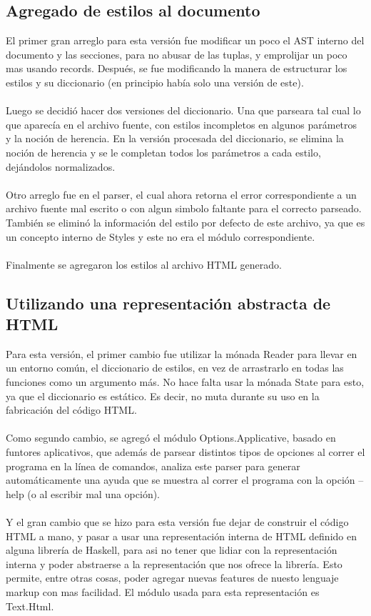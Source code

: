\documentclass{article}
\begin{document}
\subsection{Agregado de estilos al documento}
El primer gran arreglo para esta versión fue modificar un poco el AST interno del documento y las secciones, para no abusar de las tuplas, y emprolijar un poco mas usando records. Después, se fue modificando la manera de estructurar los estilos y su diccionario (en principio había solo una versión de este).
\\~\\
Luego se decidió hacer dos versiones del diccionario. Una que parseara tal cual lo que aparecía en el archivo fuente, con estilos incompletos en algunos parámetros y la noción de herencia. En la versión procesada del diccionario, se elimina la noción de herencia y se le completan todos los parámetros a cada estilo, dejándolos normalizados.
\\~\\
Otro arreglo fue en el parser, el cual ahora retorna el error correspondiente a un archivo fuente mal escrito o con algun simbolo faltante para el correcto parseado. También se eliminó la información del estilo por defecto de este archivo, ya que es un concepto interno de Styles y este no era el módulo correspondiente.
\\~\\
Finalmente se agregaron los estilos al archivo HTML generado.

\subsection{Utilizando una representación abstracta de HTML}

Para esta versión, el primer cambio fue utilizar la mónada Reader para llevar en un entorno común, el diccionario de estilos, en vez de arrastrarlo en todas las funciones como un argumento más. No hace falta usar la mónada State para esto, ya que el diccionario es estático. Es decir, no muta durante su uso en la fabricación del código HTML.
\\~\\
Como segundo cambio, se agregó el módulo Options.Applicative, basado en funtores aplicativos, que además de parsear distintos tipos de opciones al correr el programa en la línea de comandos, analiza este parser para generar automáticamente una ayuda que se muestra al correr el programa con la opción --help (o al escribir mal una opción).
\\~\\
Y el gran cambio que se hizo para esta versión fue dejar de construir el código HTML a mano, y pasar a usar una representación interna de HTML definido en alguna librería de Haskell, para asi no tener que lidiar con la representación interna y poder abstraerse a la representación que nos ofrece la librería. Esto permite, entre otras cosas, poder agregar nuevas features de nuesto lenguaje markup con mas facilidad. El módulo usada para esta representación es Text.Html.
\end{document}
